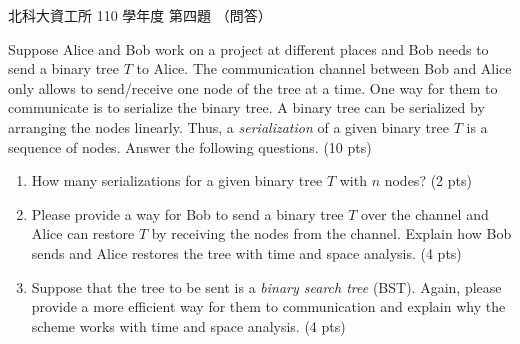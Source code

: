 \begin{pastexam}[label={px:ntut-110-ci-03}]{北科大資工所 110 學年度 第四題}
（問答）

Suppose Alice and Bob work on a project at different places and Bob needs to send a binary tree $T$
to Alice. The communication channel between Bob and Alice only allows to send/receive one node of
the tree at a time. One way for them to communicate is to serialize the binary tree. A binary tree
can be serialized by arranging the nodes linearly. Thus, a \textit{serialization} of a given binary
tree $T$ is a sequence of nodes. Answer the following questions. (10 pts)
\begin{enumerate}[label=(\arabic*)]
\item How many serializations for a given binary tree $T$ with $n$ nodes? (2 pts)
\item Please provide a way for Bob to send a binary tree $T$ over the channel and Alice can restore
$T$ by receiving the nodes from the channel. Explain how Bob sends and Alice restores the tree with
time and space analysis. (4 pts)
\item Suppose that the tree to be sent is a \textit{binary search tree} (BST). Again, please provide
a more efficient way for them to communication and explain why the scheme works with time and space
analysis. (4 pts)
\end{enumerate}
\end{pastexam}


